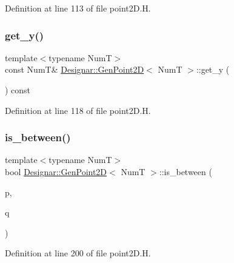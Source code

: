 Definition at line 113 of file point2\+D.\+H.

\mbox{\label{class_designar_1_1_gen_point2_d_ac8aa7a258e736f715b1e164206316f79}} 
\subsubsection{\texorpdfstring{get\+\_\+y()}{get\_y()}}
{\footnotesize\ttfamily template$<$typename NumT$>$ \\
const NumT\& \hyperlink{class_designar_1_1_gen_point2_d}{Designar\+::\+Gen\+Point2D}$<$ NumT $>$\+::get\+\_\+y (\begin{DoxyParamCaption}{ }\end{DoxyParamCaption}) const\hspace{0.3cm}{\ttfamily [inline]}}



Definition at line 118 of file point2\+D.\+H.

\mbox{\label{class_designar_1_1_gen_point2_d_ad08c66d5213123e3c3e804d1fbeedee3}} 
\subsubsection{\texorpdfstring{is\+\_\+between()}{is\_between()}}
{\footnotesize\ttfamily template$<$typename NumT$>$ \\
bool \hyperlink{class_designar_1_1_gen_point2_d}{Designar\+::\+Gen\+Point2D}$<$ NumT $>$\+::is\+\_\+between (\begin{DoxyParamCaption}\item[{const \hyperlink{class_designar_1_1_gen_point2_d}{Gen\+Point2D}$<$ NumT $>$ \&}]{p,  }\item[{const \hyperlink{class_designar_1_1_gen_point2_d}{Gen\+Point2D}$<$ NumT $>$ \&}]{q }\end{DoxyParamCaption})\hspace{0.3cm}{\ttfamily [inline]}}



Definition at line 200 of file point2\+D.\+H.

